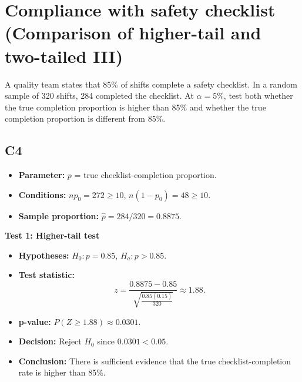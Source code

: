 \begin{center}
\end{center}


\section{Compliance with safety checklist (Comparison of higher-tail and two-tailed III)}
A quality team states that 85\% of shifts complete a safety checklist. In a random sample of 320 shifts, 284 completed the checklist. At \(\alpha=5\%\), test both whether the true completion proportion is higher than 85\% and whether the true completion proportion is different from 85\%.

\subsection*{C4}
\begin{itemize}
	\item \textbf{Parameter:} \(p\) = true checklist-completion proportion.
	\item \textbf{Conditions:} \(np_0=272\ge10\), \(n(1-p_0)=48\ge10\).
	\item \textbf{Sample proportion:} \(\hat p=284/320=0.8875\).
\end{itemize}

\textbf{Test 1: Higher-tail test}

\begin{itemize}
	\item \textbf{Hypotheses:} \(H_0\colon p=0.85\), \(H_a\colon p>0.85\).
	\item \textbf{Test statistic:}
	\[
	z=\frac{0.8875-0.85}{\sqrt{\frac{0.85(0.15)}{320}}}\approx 1.88.
	\]
	\item \textbf{p-value:} \(P(Z\ge 1.88)\approx 0.0301\).
	\item \textbf{Decision:} Reject \(H_0\) since \(0.0301<0.05\).
	\item \textbf{Conclusion:} There is sufficient evidence that the true checklist-completion rate is higher than 85\%.
\end{itemize}

\begin{center}
\end{center}

